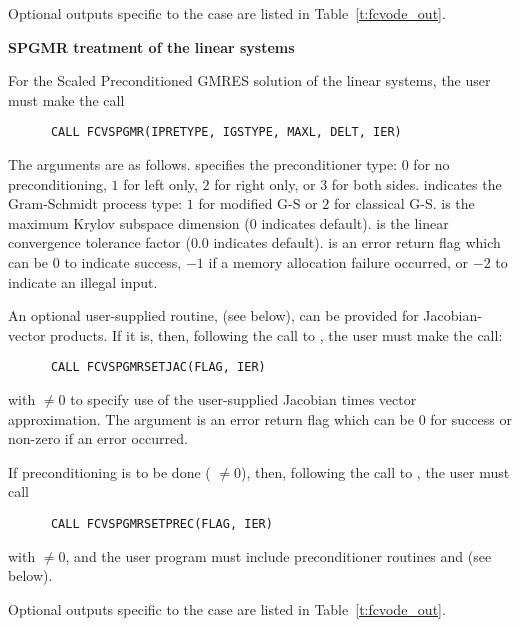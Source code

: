 \begin{Steps}
  Optional outputs specific to the {\band} case are listed in Table~\ref{t:fcvode_out}.

  
  {\s}{\p} {\bf SPGMR treatment of the linear systems}
  
  For the Scaled Preconditioned GMRES solution of the linear systems,
  the user must make the call
\begin{verbatim}
      CALL FCVSPGMR(IPRETYPE, IGSTYPE, MAXL, DELT, IER)
\end{verbatim}
  The arguments are as follows.
   specifies the preconditioner type: 
  $0$ for no preconditioning, $1$ for left only, $2$ for right only, or $3$ for
  both sides.  indicates the Gram-Schmidt process type: 
  $1$ for modified G-S or $2$ for classical G-S.
   is the maximum Krylov subspace dimension ($0$ indicates default).
   is the linear convergence tolerance factor ($0.0$ indicates default).
   is an error return flag which can be $0$ to indicate success, $-1$
  if a memory allocation failure occurred, or $-2$ to indicate an illegal input.
  
  An optional user-supplied routine,  (see below), can be provided for
  Jacobian-vector products.  If it is, then, following the call to
  , the user must make the call:
\begin{verbatim}
      CALL FCVSPGMRSETJAC(FLAG, IER)
\end{verbatim}
  with  $\neq 0$ to specify use of the user-supplied Jacobian times
  vector approximation.
  The argument  is an error return flag which can be $0$ 
  for success or non-zero if an error occurred.
  
  If preconditioning is to be done ( $\neq 0$), then, following the
  call to , the user must call
\begin{verbatim}
      CALL FCVSPGMRSETPREC(FLAG, IER)
\end{verbatim}
  with  $\neq 0$, and the user program must include preconditioner routines
   and  (see below).

  Optional outputs specific to the {\spgmr} case are listed in Table~\ref{t:fcvode_out}.
  

\end{Steps}

